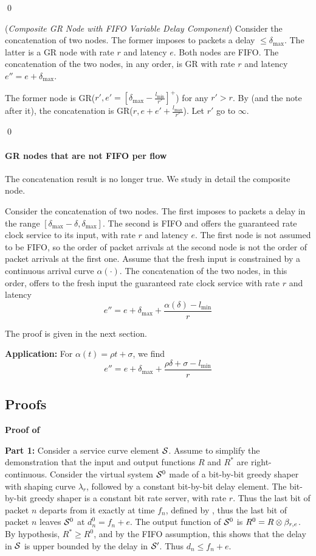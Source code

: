 \qed

\begin{theorem}(\emph{Composite GR Node with FIFO Variable Delay
Component})  Consider the concatenation of
two nodes. The former imposes to packets a delay  $\leq
\delta_{\max}$. The latter is a GR node with rate $r$ and
latency $e$. Both nodes are FIFO. The concatenation of the two
nodes, in any order, is GR with rate $r$ and latency $e''=e
+\delta_{\max}$.
\end{theorem}
\pr
The former node is
GR($r',e'=[\delta_{\max}-\frac{l_{\min}}{r'}]^+$) for any $r'
>r$. By  (and the note after it), the concatenation is
GR($r,e+e'+\frac{l_{\max}}{r'}$). Let $r'$ go to $\infty$.

\qed

\paragraph{GR nodes that are not FIFO per flow} The concatenation
result is no longer true. We study in detail the composite
node.

\begin{theorem}
 Consider the concatenation of two nodes.
The first imposes to packets a delay in the range
$[\delta_{\max}-\delta, \delta_{\max}]$. The second is FIFO
and offers the guaranteed rate clock service to its input,
with rate $r$ and latency $e$. The first node is not assumed
to be FIFO, so the order of packet arrivals at the second node
is not the order of packet arrivals at the first one. Assume
that the fresh input is constrained by a continuous arrival
curve $\alpha(\cdot)$. The concatenation of the two nodes, in
this order,  offers to the fresh input the guaranteed rate
clock service with rate $r$ and latency $$e''=e+ \delta_{\max}
+
 \frac{\alpha( \delta) - l_{\min}}{r}
$$
\end{theorem}
The proof is given in the next section.

\textbf{Application: } For $\alpha(t)=\rho t + \sigma$, we
find
$$
 e''=e+ \delta_{\max}+\frac{\rho \delta +
\sigma -
   l_{\min}}{r}
$$


\subsection{Proofs}

\textbf{Proof of }

\textbf{Part 1: } Consider a service curve element $\mathcal S$. Assume
to simplify the demonstration that the input and output functions
$R$ and $R^*$ are right-continuous. Consider the virtual system
$\mathcal S^0$ made of a bit-by-bit greedy shaper with shaping curve
$\lambda_r$, followed by a constant bit-by-bit delay element. The
bit-by-bit greedy shaper is a constant bit rate server, with rate
$r$. Thus the last bit of packet $n$ departs from it exactly at
time $f_n$, defined by , thus the last bit of
packet $n$ leaves $\mathcal S^0$ at $d^0_n=f_n + e$. The output
function of $\mathcal S^0$ is $R^0=R \otimes \beta_{r,e}$. By hypothesis,
$R^* \geq R^0$, and by the FIFO assumption, this shows that the
delay in $\mathcal S$ is upper bounded by the delay in $\mathcal S'$. Thus
$d_n \leq f_n +e$.


